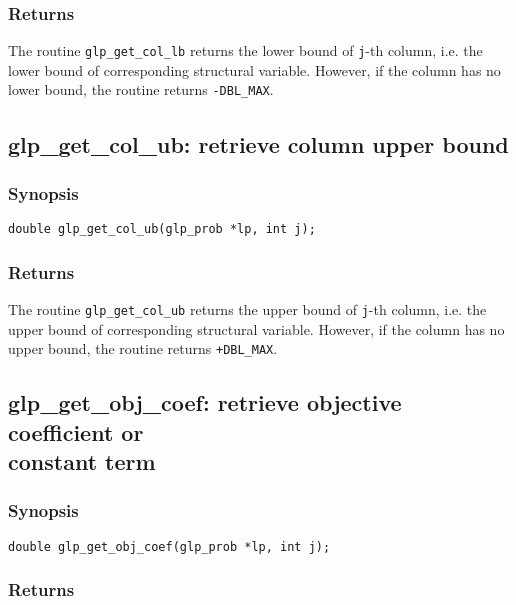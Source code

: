 \subsubsection*{Returns}

The routine \verb|glp_get_col_lb| returns the lower bound of
\verb|j|-th column, i.e. the lower bound of corresponding structural
variable. However, if the column has no lower bound, the routine returns
\verb|-DBL_MAX|.

\subsection{glp\_get\_col\_ub: retrieve column upper bound}

\subsubsection*{Synopsis}

\begin{verbatim}
double glp_get_col_ub(glp_prob *lp, int j);
\end{verbatim}

\subsubsection*{Returns}

The routine \verb|glp_get_col_ub| returns the upper bound of
\verb|j|-th column, i.e. the upper bound of corresponding structural
variable. However, if the column has no upper bound, the routine returns
\verb|+DBL_MAX|.

\subsection{glp\_get\_obj\_coef: retrieve objective coefficient or\\
constant term}

\subsubsection*{Synopsis}

\begin{verbatim}
double glp_get_obj_coef(glp_prob *lp, int j);
\end{verbatim}

\subsubsection*{Returns}

